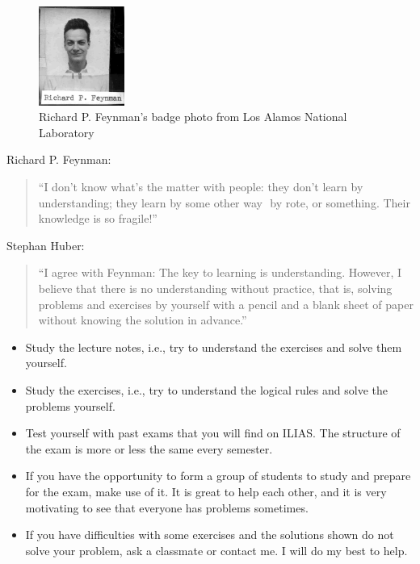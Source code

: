 \documentclass[
  12pt,
  oneside]{book}
\providecommand{\tightlist}{%
  \setlength{\itemsep}{0pt}\setlength{\parskip}{0pt}}
\theoremstyle{definition}
\theoremstyle{definition}
\theoremstyle{definition}
\theoremstyle{definition}
\theoremstyle{remark}
\begin{document}
\begin{figure}
\centering
\includegraphics[width=0.25\textwidth,height=\textheight]{fig/Richard-Feynman.jpg}
\caption[\label{fig:feynman} Richard P. Feynman's badge photo from Los Alamos National Laboratory]{\label{fig:feynman} Richard P. Feynman's badge photo from Los Alamos National Laboratory\footnotemark{}}
\end{figure}

Richard P. Feynman:

\begin{quote}
``I don't know what's the matter with people: they don't learn by understanding; they learn by some other way ­ by rote, or something. Their knowledge is so fragile!''
\end{quote}

Stephan Huber:

\begin{quote}
``I agree with Feynman: The key to learning is understanding. However, I believe that there is no understanding without practice, that is, solving problems and exercises by yourself with a pencil and a blank sheet of paper without knowing the solution in advance.''
\end{quote}

\begin{itemize}
\tightlist
\item
  Study the lecture notes, i.e., try to understand the exercises and solve them yourself.
\item
  Study the exercises, i.e., try to understand the logical rules and solve the problems yourself.
\item
  Test yourself with past exams that you will find on ILIAS. The structure of the exam is more or less the same every semester.
\item
  If you have the opportunity to form a group of students to study and prepare for the exam, make use of it. It is great to help each other, and it is very motivating to see that everyone has problems sometimes.
\item
  If you have difficulties with some exercises and the solutions shown do not solve your problem, ask a classmate or contact me. I will do my best to help.
\end{itemize}
\end{document}
